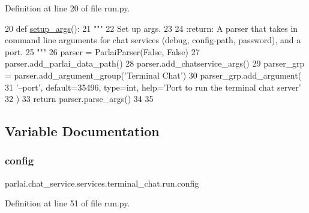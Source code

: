 Definition at line 20 of file run.\+py.


\begin{DoxyCode}
20 \textcolor{keyword}{def }\hyperlink{namespaceparlai_1_1tasks_1_1talkthewalk_1_1run_a3534e8afa0a4dc25a6e02740fa35ac84}{setup\_args}():
21     \textcolor{stringliteral}{"""}
22 \textcolor{stringliteral}{    Set up args.}
23 \textcolor{stringliteral}{}
24 \textcolor{stringliteral}{    :return: A parser that takes in command line arguments for chat services (debug, config-path,
       password), and a port.}
25 \textcolor{stringliteral}{    """}
26     parser = ParlaiParser(\textcolor{keyword}{False}, \textcolor{keyword}{False})
27     parser.add\_parlai\_data\_path()
28     parser.add\_chatservice\_args()
29     parser\_grp = parser.add\_argument\_group(\textcolor{stringliteral}{'Terminal Chat'})
30     parser\_grp.add\_argument(
31         \textcolor{stringliteral}{'--port'}, default=35496, type=int, help=\textcolor{stringliteral}{'Port to run the terminal chat server'}
32     )
33     \textcolor{keywordflow}{return} parser.parse\_args()
34 
35 
\end{DoxyCode}


\subsection{Variable Documentation}
\mbox{\label{namespaceparlai_1_1chat__service_1_1services_1_1terminal__chat_1_1run_a4361047d588ccc6be7146ba6a063cd9f}} 
\subsubsection{\texorpdfstring{config}{config}}
{\footnotesize\ttfamily parlai.\+chat\+\_\+service.\+services.\+terminal\+\_\+chat.\+run.\+config}



Definition at line 51 of file run.\+py.

\mbox{\label{namespaceparlai_1_1chat__service_1_1services_1_1terminal__chat_1_1run_abd978d236634b8e2de3e12adc2b65fd0}} 
